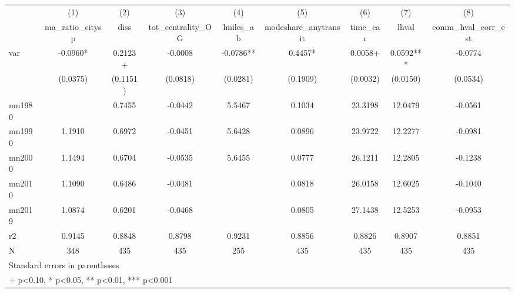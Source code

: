 {
\def\sym#1{\ifmmode^{#1}\else\(^{#1}\)\fi}
\begin{tabular}{l*{8}{c}}
\toprule
            &\multicolumn{1}{c}{(1)}   &\multicolumn{1}{c}{(2)}   &\multicolumn{1}{c}{(3)}   &\multicolumn{1}{c}{(4)}   &\multicolumn{1}{c}{(5)}   &\multicolumn{1}{c}{(6)}   &\multicolumn{1}{c}{(7)}   &\multicolumn{1}{c}{(8)}   \\
            &ma\_ratio\_citysp   &        diss   &tot\_centrality\_OG   &   lmiles\_ab   &modeshare\_anytransit   &    time\_car   &       lhval   &comm\_hval\_corr\_est   \\
\midrule
var         &     -0.0960*  &      0.2123+  &     -0.0008   &     -0.0786** &      0.4457*  &      0.0058+  &      0.0592***&     -0.0774   \\
            &    (0.0375)   &    (0.1151)   &    (0.0818)   &    (0.0281)   &    (0.1909)   &    (0.0032)   &    (0.0150)   &    (0.0534)   \\
\midrule
mn1980      &               &      0.7455   &     -0.0442   &      5.5467   &      0.1034   &     23.3198   &     12.0479   &     -0.0561   \\
mn1990      &      1.1910   &      0.6972   &     -0.0451   &      5.6428   &      0.0896   &     23.9722   &     12.2277   &     -0.0981   \\
mn2000      &      1.1494   &      0.6704   &     -0.0535   &      5.6455   &      0.0777   &     26.1211   &     12.2805   &     -0.1238   \\
mn2010      &      1.1090   &      0.6486   &     -0.0481   &               &      0.0818   &     26.0158   &     12.6025   &     -0.1040   \\
mn2019      &      1.0874   &      0.6201   &     -0.0468   &               &      0.0805   &     27.1438   &     12.5253   &     -0.0953   \\
r2          &      0.9145   &      0.8848   &      0.8798   &      0.9231   &      0.8856   &      0.8826   &      0.8907   &      0.8851   \\
N           &         348   &         435   &         435   &         255   &         435   &         435   &         435   &         435   \\
\bottomrule
\multicolumn{9}{l}{\footnotesize Standard errors in parentheses}\\
\multicolumn{9}{l}{\footnotesize + p<0.10, * p<0.05, ** p<0.01, *** p<0.001}\\
\end{tabular}
}
